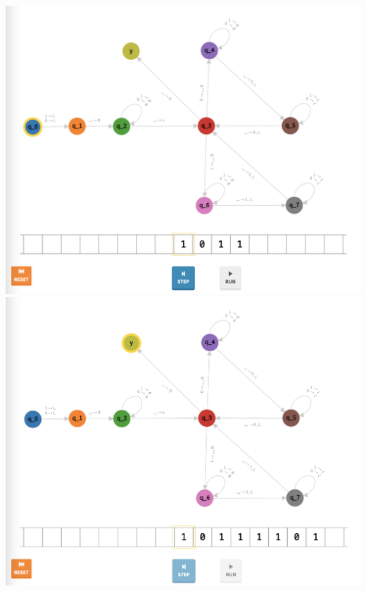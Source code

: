 \documentclass[a4paper]{article}
\begin{document}
\begin{center}
\includegraphics[width=\textwidth]{TM2.3}
\includegraphics[width=\textwidth]{TM2.4}
\end{center}
\newpage
\end{document}
